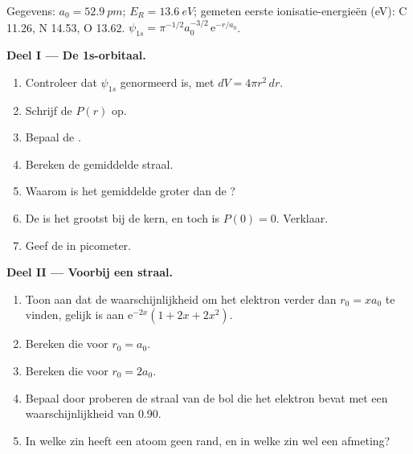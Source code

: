 \begin{problem}
\label{pb:b2:atomic-orbitals:1}
Gegevens: $a_0 = \qty{52.9}{pm}$; $E_R = \qty{13.6}{eV}$; gemeten eerste ionisatie-energieën
(\unit{eV}): C 11.26, N 14.53, O 13.62. $\psi_{1s} = \pi^{-1/2}a_0^{-3/2}\,
\mathrm e^{-r/a_0}$.

\medskip
\noindent\textbf{Deel I --- De 1s-orbitaal.}
\begin{enumerate}
  \item Controleer dat $\psi_{1s}$ genormeerd is, met $dV = 4\pi r^2\,dr$.
  \item Schrijf de  $P(r)$ op.
  \item Bepaal de .
  \item Bereken de gemiddelde straal.
  \item Waarom is het gemiddelde groter dan de ?
  \item De  is het grootst bij de kern, en toch is $P(0) = 0$.
        Verklaar.
  \item Geef de  in picometer.
\end{enumerate}

\medskip
\noindent\textbf{Deel II --- Voorbij een straal.}
\begin{enumerate}[resume]
  \item Toon aan dat de waarschijnlijkheid om het elektron verder dan $r_0 =
        xa_0$ te vinden, gelijk is aan $\mathrm e^{-2x}(1 + 2x + 2x^2)$.
  \item Bereken die voor $r_0 = a_0$.
  \item Bereken die voor $r_0 = 2a_0$.
  \item Bepaal door proberen de straal van de bol die het elektron bevat met een
        waarschijnlijkheid van 0.90.
  \item In welke zin heeft een atoom geen rand, en in welke zin wel een afmeting?
\end{enumerate}


\end{problem}
